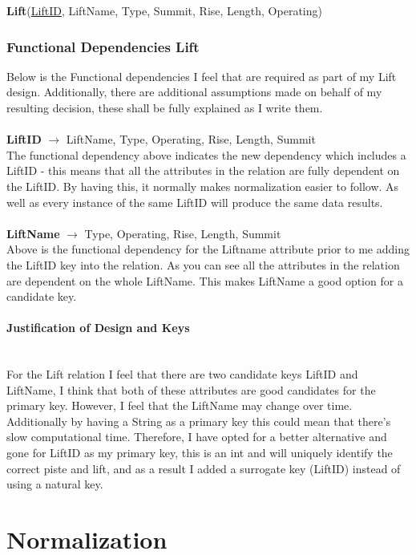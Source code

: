 \documentclass[12pt]{article}
\begin{document}
\par{\textbf{Lift}(\uline{LiftID}, LiftName, Type, Summit, Rise, Length, Operating)

\subsubsection{Functional Dependencies Lift}

\par{ Below is the Functional dependencies I feel that are required as part of my Lift design. Additionally, there are additional assumptions made on behalf of my resulting decision, these shall be fully explained as I write them.\\\\}
\-\hspace{1.8cm}
\textbf{LiftID} $\rightarrow$ LiftName, Type, Operating, Rise, Length, Summit~\\
The functional dependency above indicates the new dependency which includes a LiftID - this means that all the attributes in the relation are fully dependent on the LiftID. By having this, it normally makes normalization easier to follow. As well as every instance of the same LiftID will produce the same data results.~\\\\
\-\hspace{1.8cm}
{\textbf{LiftName} $\rightarrow$ Type, Operating, Rise, Length, Summit}~\\
Above is the functional dependency for the Liftname attribute prior to me adding the LiftID key into the relation. As you can see all the attributes in the relation are dependent on the whole LiftName. This makes LiftName a good option for a candidate key.
\paragraph{Justification of Design and Keys}\mbox{}\\
For the Lift relation I feel that there are two candidate keys LiftID and LiftName, I think that both of these attributes are good candidates for the primary key. However, I feel that the LiftName may change over time. Additionally by having a String as a primary key this could mean that there's slow computational time. Therefore, I have opted for a better alternative and gone for LiftID as my primary key, this is an int and will uniquely identify the correct piste and lift, and as a result I added a surrogate key (LiftID) instead of using a natural key.
\section{Normalization}
}
\end{document}
